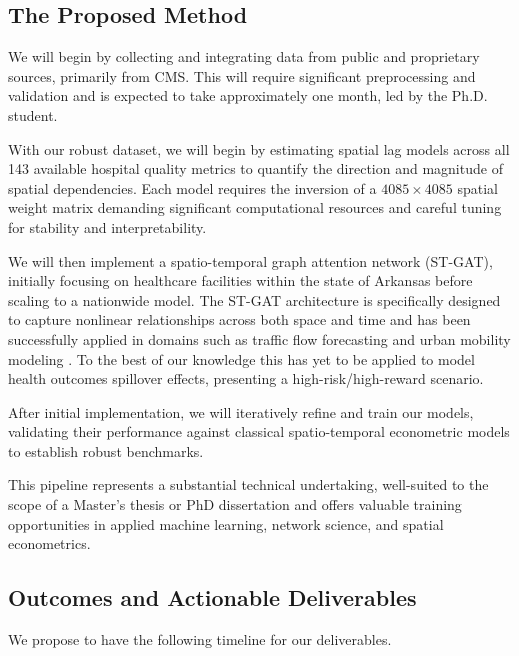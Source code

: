 \documentclass[10pt]{article}
\begin{document}
\subsection*{The Proposed Method}

We will begin by collecting and integrating data from public and proprietary sources, primarily from CMS. This will require significant preprocessing and validation and is expected to take approximately one month, led by the Ph.D. student.

With our robust dataset, we will begin by estimating spatial lag models across all 143 available hospital quality metrics to quantify the direction and magnitude of spatial dependencies. Each model requires the inversion of a $4085\times 4085$ spatial weight matrix demanding significant computational resources and careful tuning for stability and interpretability.

We will then implement a spatio-temporal graph attention network (ST-GAT), initially focusing on healthcare facilities within the state of Arkansas before scaling to a nationwide model. The ST-GAT architecture is specifically designed to capture nonlinear relationships across both space and time and has been successfully applied in domains such as traffic flow forecasting and urban mobility modeling \cite{10.1145/3511808.3557705}. To the best of our knowledge this has yet to be applied to model health outcomes spillover effects, presenting a high-risk/high-reward scenario.

After initial implementation, we will iteratively refine and train our models, validating their performance against classical spatio-temporal econometric models to establish robust benchmarks.

This pipeline represents a substantial technical undertaking, well-suited to the scope of a Master's thesis or PhD dissertation and offers valuable training opportunities in applied machine learning, network science, and spatial econometrics.



\subsection*{Outcomes and Actionable Deliverables}

We propose to have the following timeline for our deliverables.
\end{document}
